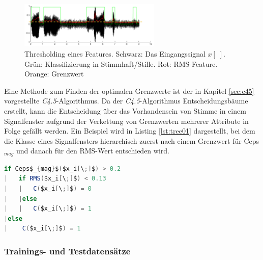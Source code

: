 \begin{figure}[h]
	\centering
	\includegraphics[width=0.6\textwidth]{bilder/thresholded02.png}
	\caption{Thresholding eines Features. Schwarz: Das Eingangssignal $x[\;]$. Grün: Klassifizierung in Stimmhaft/Stille. Rot: RMS-Feature. Orange: Grenzwert}
	\label{img:thresholded}
\end{figure}

Eine Methode zum Finden der optimalen Grenzwerte ist der in Kapitel \ref{sec:c45} vorgestellte \emph{C4.5}-Algorithmus. Da der \emph{C4.5}-Algorithmus Entscheidungsbäume erstellt, kann die Entscheidung über das Vorhandensein von Stimme in einem Signalfenster aufgrund der Verkettung von Grenzwerten mehrerer Attribute in Folge gefällt werden. Ein Beispiel wird in Listing \ref{lst:tree01} dargestellt, bei dem die Klasse eines  Signalfensters hierarchisch zuerst nach einem Grenzwert für Ceps$_{mag}$ und danach für den RMS-Wert entschieden wird.

\begin{lstlisting}[frame=single,mathescape=true,basicstyle=\footnotesize,language=Java,label=lst:tree01,caption=Beispiel eines CART-Entscheidungsbaums,linewidth=1\textwidth]
if Ceps$_{mag}$($x_i[\;]$) > 0.2
|   if RMS($x_i[\;]$) < 0.13
|   |   C($x_i[\;]$) = 0
|   |else
|   |   C($x_i[\;]$) = 1
|else
|    C($x_i[\;]$) = 1
\end{lstlisting}

\subsubsection{Trainings- und Testdatensätze}
\label{sec:databases}

